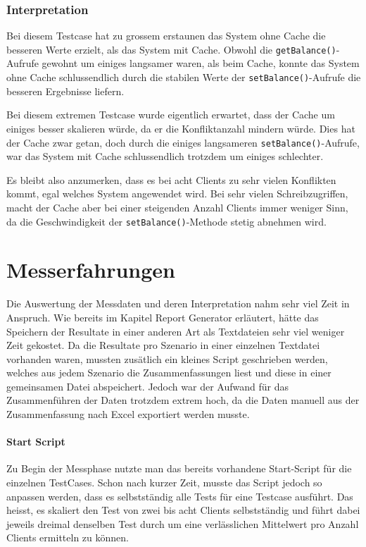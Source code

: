 \subsubsection{Interpretation}

Bei diesem Testcase hat zu grossem erstaunen das System ohne Cache die besseren Werte erzielt, als das System mit Cache. Obwohl die \texttt{getBalance()}-Aufrufe gewohnt um einiges langsamer waren, als beim Cache, konnte das System ohne Cache schlussendlich durch die stabilen Werte der \texttt{setBalance()}-Aufrufe die besseren Ergebnisse liefern.

 Bei diesem extremen Testcase wurde eigentlich erwartet, dass der Cache um einiges besser skalieren würde, da er die Konfliktanzahl mindern würde. Dies hat der Cache zwar getan, doch durch die einiges lang\-sa\-mer\-en \texttt{set\-Balance()}-Auf\-ru\-fe, war das System mit Cache schlus\-send\-lich trotz\-dem um ei\-nig\-es sch\-lech\-ter. 

Es bleibt also anzumerken, dass es bei acht Clients zu sehr vielen Konflikten kommt, egal welches System angewendet wird. Bei sehr vielen Schreibzugriffen, macht der Cache aber bei einer steigenden Anzahl Clients immer weniger Sinn, da die Geschwindigkeit der  \texttt{setBalance()}-Methode stetig abnehmen wird.

\section{Messerfahrungen}
Die Auswertung der Messdaten und deren Interpretation nahm sehr viel Zeit in Anspruch. Wie bereits im Kapitel Report Generator erläutert, hätte das Speichern der Resultate in einer anderen Art als Textdateien sehr viel weniger Zeit gekostet. Da die Resultate pro Szenario in einer einzelnen Textdatei vorhanden waren, mussten zusätlich ein kleines Script geschrieben werden, welches  aus jedem Szenario die Zusammenfassungen liest und diese in einer gemeinsamen Datei abspeichert. Jedoch war der Aufwand für das Zusammenführen der Daten trotzdem extrem hoch, da die Daten manuell aus der Zusammenfassung nach Excel exportiert werden musste. 

\paragraph{Start Script}
Zu Begin der Messphase nutzte man das bereits vorhandene Start-Script für die einzelnen TestCases. Schon nach kurzer Zeit, musste das Script jedoch so anpassen werden, dass es selbstständig alle Tests für eine Testcase ausführt. Das heisst, es skaliert den Test von zwei bis acht Clients selbstständig und führt dabei jeweils dreimal denselben Test durch um eine verlässlichen Mittelwert pro Anzahl Clients ermitteln zu können.


